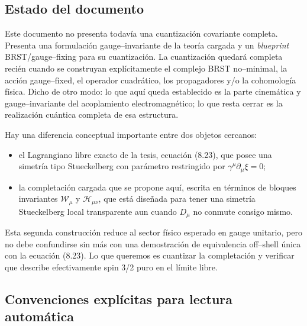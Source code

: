 \documentclass[11pt,a4paper]{article}
\numberwithin{equation}{section}
\newcommand{\Wcal}{\mathcal W}
\newcommand{\Hcal}{\mathcal H}
\newcommand{\sdel}{\gamma^\mu\partial_\mu}
\begin{document}
\subsection*{Estado del documento}

Este documento no presenta todavía una cuantización covariante completa. Presenta una formulación gauge--invariante de la teoría cargada y un \emph{blueprint} BRST/gauge--fixing para su cuantización. La cuantización quedará completa recién cuando se construyan explícitamente el complejo BRST no--minimal, la acción gauge--fixed, el operador cuadrático, los propagadores y/o la cohomología física. Dicho de otro modo: lo que aquí queda establecido es la parte cinemática y gauge--invariante del acoplamiento electromagnético; lo que resta cerrar es la realización cuántica completa de esa estructura.

Hay una diferencia conceptual importante entre dos objetos cercanos:
\begin{itemize}
\item el Lagrangiano libre exacto de la tesis, ecuación (8.23), que posee una simetría tipo Stueckelberg con parámetro restringido por $\sdel\xi=0$;
\item la completación cargada que se propone aquí, escrita en términos de bloques invariantes $\Wcal_\mu$ y $\Hcal_{\mu\nu}$, que está diseñada para tener una simetría Stueckelberg local transparente aun cuando $D_\mu$ no conmute consigo mismo.
\end{itemize}
Esta segunda construcción reduce al sector físico esperado en gauge unitario, pero no debe confundirse sin más con una demostración de equivalencia off--shell única con la ecuación (8.23). Lo que queremos es cuantizar la completación y verificar que describe efectivamente spin 3/2 puro en el límite libre.


\subsection*{Convenciones explícitas para lectura automática}
\end{document}
